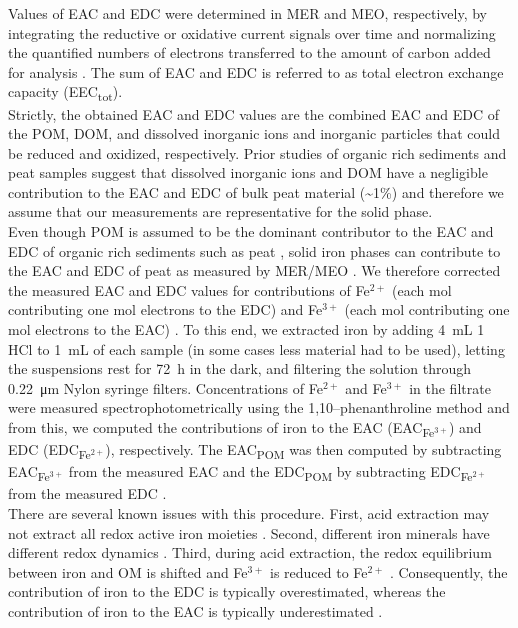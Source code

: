 \documentclass[alpha-refs, lineno]{wiley-article-rmd}
\begin{document}
Values of EAC and EDC were determined in MER and MEO, respectively, by integrating the reductive or oxidative current signals over time and normalizing the quantified numbers of electrons transferred to the amount of carbon added for analysis \autocite{Aeschbacher.2010}. The sum of EAC and EDC is referred to as total electron exchange capacity (EEC\textsubscript{tot}).\\
Strictly, the obtained EAC and EDC values are the combined EAC and EDC of the POM, DOM, and dissolved inorganic ions and inorganic particles that could be reduced and oxidized, respectively. Prior studies of organic rich sediments and peat samples suggest that dissolved inorganic ions and DOM have a negligible contribution to the EAC and EDC of bulk peat material (\textasciitilde1\%) \autocite{Lau.2015,Gao.2019} and therefore we assume that our measurements are representative for the solid phase.\\
Even though POM is assumed to be the dominant contributor to the EAC and EDC of organic rich sediments such as peat \autocite{Lau.2015,Gao.2019}, solid iron phases can contribute to the EAC and EDC of peat as measured by MER/MEO \autocite{Lau.2015}. We therefore corrected the measured EAC and EDC values for contributions of Fe\(^{2+}\) (each mol contributing one mol electrons to the EDC) and Fe\(^{3+}\) (each mol contributing one mol electrons to the EAC) \autocite{Lau.2015,Gao.2019}. To this end, we extracted iron by adding \SI{4}{\milli\liter} \SI{1}{\Molar} HCl to \SI{1}{\milli\liter} of each sample (in some cases less material had to be used), letting the suspensions rest for \SI{72}{\hour} in the dark, and filtering the solution through \SI{0.22}{\micro\meter} Nylon syringe filters. Concentrations of Fe\(^{2+}\) and Fe\(^{3+}\) in the filtrate were measured spectrophotometrically using the 1,10--phenanthroline method \autocite{Tamura.1974} and from this, we computed the contributions of iron to the EAC (EAC\textsubscript{Fe$^{3+}$}) and EDC (EDC\textsubscript{Fe$^{2+}$}), respectively. The EAC\textsubscript{POM} was then computed by subtracting EAC\textsubscript{Fe$^{3+}$} from the measured EAC and the EDC\textsubscript{POM} by subtracting EDC\textsubscript{Fe$^{2+}$} from the measured EDC \autocite{Lau.2015}.\\
There are several known issues with this procedure. First, acid extraction may not extract all redox active iron moieties \autocite{Lau.2016}. Second, different iron minerals have different redox dynamics \autocite{Aeppli.2018}. Third, during acid extraction, the redox equilibrium between iron and OM is shifted and Fe\(^{3+}\) is reduced to Fe\(^{2+}\) \autocite{Lau.2015}. Consequently, the contribution of iron to the EDC is typically overestimated, whereas the contribution of iron to the EAC is typically underestimated \autocite{Lau.2015}.\\
\end{document}
